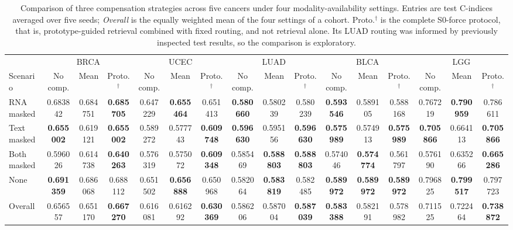 \begin{table}
\centering
\caption{Comparison of three compensation strategies across five cancers
under four modality-availability settings. Entries are test C-indices
averaged over five seeds; \emph{Overall} is the equally weighted mean of the
four settings of a cohort. Proto.$^{\dagger}$ is the complete S0-force
protocol, that is, prototype-guided retrieval combined with fixed routing,
and not retrieval alone. Its LUAD routing was informed by previously
inspected test results, so the comparison is exploratory.}
\label{tab:prototype-compensation}
\scriptsize
\setlength{\tabcolsep}{2pt}
\renewcommand{\arraystretch}{1.35}
\begin{tabular*}{\linewidth}{@{\extracolsep{\fill}}l*{15}{c}@{}}
\toprule
 & \multicolumn{3}{c}{BRCA} & \multicolumn{3}{c}{UCEC}
 & \multicolumn{3}{c}{LUAD} & \multicolumn{3}{c}{BLCA}
 & \multicolumn{3}{c}{LGG} \\
\cmidrule(lr){2-4}\cmidrule(lr){5-7}\cmidrule(lr){8-10}
\cmidrule(lr){11-13}\cmidrule(lr){14-16}
Scenario
 & No comp. & Mean & Proto.$^{\dagger}$
 & No comp. & Mean & Proto.$^{\dagger}$
 & No comp. & Mean & Proto.$^{\dagger}$
 & No comp. & Mean & Proto.$^{\dagger}$
 & No comp. & Mean & Proto.$^{\dagger}$ \\
\midrule
RNA masked & 0.683842 & 0.684751 & \textbf{0.685705} & 0.647229 & \textbf{0.655464} & 0.651413 & \textbf{0.580660} & 0.580239 & 0.580239 & \textbf{0.593546} & 0.589105 & 0.588168 & 0.767219 & \textbf{0.790959} & 0.786611 \\
Text masked & \textbf{0.655002} & 0.619121 & \textbf{0.655002} & 0.589272 & 0.577743 & \textbf{0.609748} & \textbf{0.596630} & 0.595156 & \textbf{0.596630} & \textbf{0.575989} & 0.574913 & \textbf{0.575989} & \textbf{0.705866} & 0.664113 & \textbf{0.705866} \\
Both masked & 0.596026 & 0.614738 & \textbf{0.640263} & 0.576319 & 0.575072 & \textbf{0.609348} & 0.585469 & \textbf{0.588803} & \textbf{0.588803} & 0.574046 & \textbf{0.574774} & 0.561797 & 0.576190 & 0.635266 & \textbf{0.665286} \\
None & \textbf{0.691359} & 0.686068 & 0.688112 & 0.651502 & \textbf{0.656888} & 0.650968 & 0.582064 & \textbf{0.583819} & 0.582485 & \textbf{0.589972} & \textbf{0.589972} & \textbf{0.589972} & 0.796825 & \textbf{0.799517} & 0.797723 \\
\midrule
Overall & 0.656557 & 0.651170 & \textbf{0.667270} & 0.616081 & 0.616292 & \textbf{0.630369} & 0.586206 & 0.587004 & \textbf{0.587039} & \textbf{0.583388} & 0.582191 & 0.578982 & 0.711525 & 0.722464 & \textbf{0.738872} \\

\end{tabular*}
\end{table}
